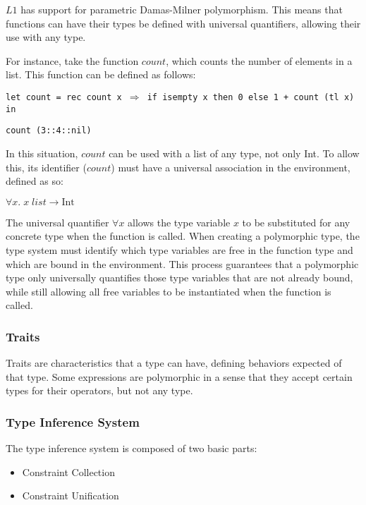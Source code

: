 \documentclass{article}
\def\code#1{\begin{footnotesize}\texttt{#1}\end{footnotesize}}
\begin{document}
$L1$ has support for parametric Damas\hyp Milner polymorphism.
This means that functions can have their types be defined with universal quantifiers, allowing their use with any type.

For instance, take the function $count$, which counts the number of elements in a list.
This function can be defined as follows:

\smallskip

\code{let count = rec count x $\Rightarrow$ if isempty x then 0 else 1 + count (tl x) in}

\code{count (3::4::nil)}

\smallskip

In this situation, $count$ can be used with a list of any type, not only Int.
To allow this, its identifier ($count$) must have a universal association in the environment, defined as so:

\smallskip
$\forall x. \; x \; list \rightarrow \mbox{Int}$
\smallskip

The universal quantifier $\forall x$ allows the type variable $x$ to be substituted for any concrete type when the function is called.
When creating a polymorphic type, the type system must identify which type variables are free in the function type and which are bound in the environment.
This process guarantees that a polymorphic type only universally quantifies those type variables that are not already bound, while still allowing all free variables to be instantiated when the function is called.

\subsubsection{Traits}

Traits are characteristics that a type can have, defining behaviors expected of that type.
Some expressions are polymorphic in a sense that they accept certain types for their operators, but not any type.

\subsubsection{Type Inference System}

The type inference system is composed of two basic parts:
\begin{itemize}
  \item Constraint Collection
  \item Constraint Unification
\end{itemize}
\end{document}
